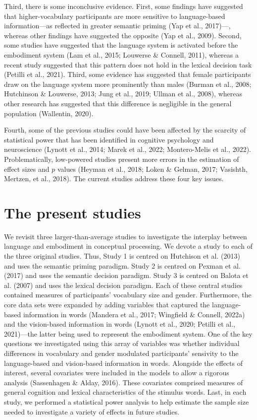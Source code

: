 \documentclass[
  12pt,
  man,floatsintext]{apa7}
\begin{document}
Third, there is some inconclusive evidence. First, some findings have suggested that higher-vocabulary participants are more sensitive to language-based information---as reflected in greater semantic priming (Yap et al., 2017)---, whereas other findings have suggested the opposite (Yap et al., 2009). Second, some studies have suggested that the language system is activated before the embodiment system (Lam et al., 2015; Louwerse \& Connell, 2011), whereas a recent study suggested that this pattern does not hold in the lexical decision task (Petilli et al., 2021). Third, some evidence has suggested that female participants draw on the language system more prominently than males (Burman et al., 2008; Hutchinson \& Louwerse, 2013; Jung et al., 2019; Ullman et al., 2008), whereas other research has suggested that this difference is negligible in the general population (Wallentin, 2020).

Fourth, some of the previous studies could have been affected by the scarcity of statistical power that has been identified in cognitive psychology and neuroscience (Lynott et al., 2014; Marek et al., 2022; Montero-Melis et al., 2022). Problematically, low-powered studies present more errors in the estimation of effect sizes and \(p\) values (Heyman et al., 2018; Loken \& Gelman, 2017; Vasishth, Mertzen, et al., 2018). The current studies address these four key issues.

\hypertarget{present-studies}{%
\section{The present studies}\label{present-studies}}

We revisit three larger-than-average studies to investigate the interplay between language and embodiment in conceptual processing. We devote a study to each of the three original studies. Thus, Study 1 is centred on Hutchison et al. (2013) and uses the semantic priming paradigm. Study 2 is centred on Pexman et al. (2017) and uses the semantic decision paradigm. Study 3 is centred on Balota et al. (2007) and uses the lexical decision paradigm. Each of these central studies contained measures of participants' vocabulary size and gender. Furthermore, the core data sets were expanded by adding variables that captured the language-based information in words (Mandera et al., 2017; Wingfield \& Connell, 2022a) and the vision-based information in words (Lynott et al., 2020; Petilli et al., 2021)---the latter being used to represent the embodiment system. One of the key questions we investigated using this array of variables was whether individual differences in vocabulary and gender modulated participants' sensivity to the language-based and vision-based information in words. Alongside the effects of interest, several covariates were included in the models to allow a rigorous analysis (Sassenhagen \& Alday, 2016). These covariates comprised measures of general cognition and lexical characteristics of the stimulus words. Last, in each study, we performed a statistical power analysis to help estimate the sample size needed to investigate a variety of effects in future studies.
\end{document}
